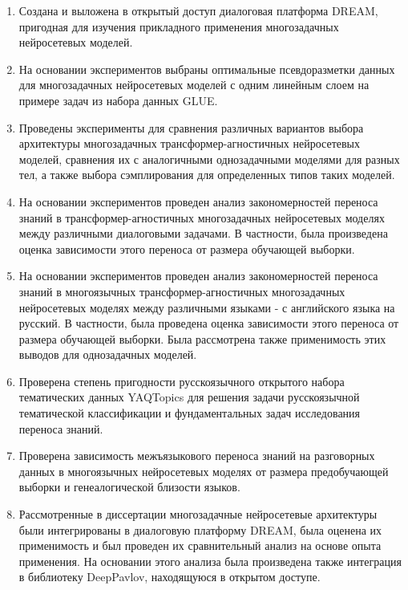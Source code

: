 {\novelty}
\begin{enumerate}
  \item {Создана и выложена в открытый доступ диалоговая платформа DREAM, пригодная для изучения прикладного применения многозадачных нейросетевых моделей.}
  \item {На основании экспериментов выбраны оптимальные псевдоразметки данных для многозадачных нейросетевых моделей с одним линейным слоем на примере задач из набора данных GLUE.}
  \item {Проведены эксперименты для сравнения различных вариантов выбора архитектуры многозадачных трансформер-агностичных нейросетевых моделей, сравнения их с аналогичными однозадачными моделями для разных тел, а также выбора сэмплирования для определенных типов таких моделей.}
  \item {На основании экспериментов проведен анализ закономерностей переноса знаний в трансформер-агностичных многозадачных нейросетевых моделях между различными диалоговыми задачами. В частности, была произведена оценка зависимости этого переноса от размера обучающей выборки.}
  \item {На основании экспериментов проведен анализ закономерностей переноса знаний в многоязычных трансформер-агностичных многозадачных нейросетевых моделях между различными языками - с английского языка на русский. В частности, была проведена оценка зависимости этого переноса от размера обучающей выборки. Была рассмотрена также применимость этих выводов для однозадачных моделей.}
  \item {Проверена степень пригодности русскоязычного открытого набора тематических данных {YAQTopics} для решения задачи русскоязычной тематической классификации и фундаментальных задач исследования переноса знаний.}
  \item {Проверена зависимость межъязыкового переноса знаний на разговорных данных в многоязычных нейросетевых моделях от размера предобучающей выборки и генеалогической близости языков.}
  \item {Рассмотренные в диссертации многозадачные нейросетевые архитектуры были интегрированы в диалоговую платформу DREAM, была оценена их применимость и был проведен их сравнительный анализ на основе опыта применения. На основании этого анализа была произведена также интеграция в библиотеку DeepPavlov, находящуюся в открытом доступе.} 
\end{enumerate}

